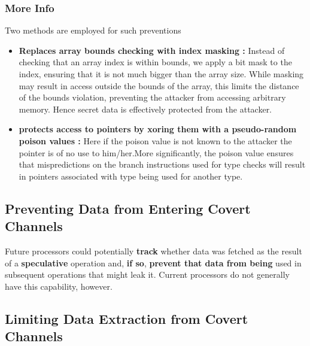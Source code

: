 \documentclass[12pt]{article}
\begin{document}
\subsubsection{More Info}
Two methods are employed for such preventions
\begin{itemize}
	\item \textbf{Replaces array bounds checking with index masking	:} Instead of checking that an array index is within bounds, we apply a bit mask to the index, ensuring that it is not much bigger than the array size. While masking may result in access outside the bounds of the array, this limits the distance of the bounds violation, preventing the attacker from accessing arbitrary memory. Hence secret data is effectively protected from the attacker.
	\item \textbf{protects access to pointers by xoring them with a pseudo-random poison values	:} Here if the poison value is not known to the attacker the pointer is of no use to him/her.More significantly, the poison value ensures that mispredictions on the branch instructions used for type checks will result in pointers associated with type being used for another type.
\end{itemize}
\subsection{Preventing Data from Entering Covert Channels}
Future processors could potentially \textbf{track} whether data was
fetched as the result of a \textbf{speculative} operation and, \textbf{if so},
\textbf{prevent that data from being} used in subsequent operations
that might leak it. Current processors do not generally have
this capability, however.
\subsection{Limiting Data Extraction from Covert Channels}
\end{document}

